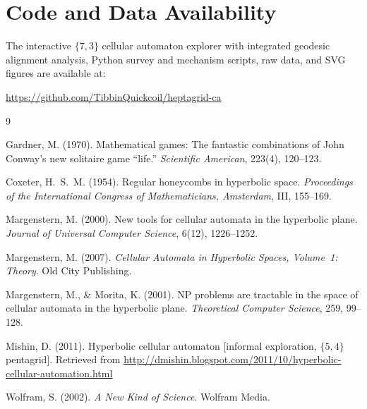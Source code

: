 \documentclass[12pt,a4paper]{article}
\begin{document}
\section*{Code and Data Availability}

The interactive $\{7,3\}$ cellular automaton explorer with integrated geodesic alignment analysis, Python survey and mechanism scripts, raw data, and SVG figures are available at:
\begin{center}
\url{https://github.com/TibbinQuickcoil/heptagrid-ca}
\end{center}

\begin{thebibliography}{9}

Gardner, M. (1970).
Mathematical games: The fantastic combinations of John Conway's new solitaire game ``life.''
\textit{Scientific American}, 223(4), 120--123.

Coxeter, H.~S.~M. (1954).
Regular honeycombs in hyperbolic space.
\textit{Proceedings of the International Congress of Mathematicians, Amsterdam}, III, 155--169.

Margenstern, M. (2000).
New tools for cellular automata in the hyperbolic plane.
\textit{Journal of Universal Computer Science}, 6(12), 1226--1252.

Margenstern, M. (2007).
\textit{Cellular Automata in Hyperbolic Spaces, Volume~1: Theory}.
Old City Publishing.

Margenstern, M., \& Morita, K. (2001).
NP problems are tractable in the space of cellular automata in the hyperbolic plane.
\textit{Theoretical Computer Science}, 259, 99--128.

Mishin, D. (2011).
Hyperbolic cellular automaton [informal exploration, $\{5,4\}$ pentagrid].
Retrieved from \url{http://dmishin.blogspot.com/2011/10/hyperbolic-cellular-automation.html}

Wolfram, S. (2002).
\textit{A New Kind of Science}.
Wolfram Media.

\end{thebibliography}
\end{document}
